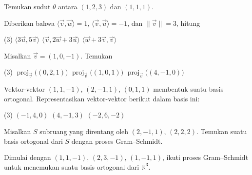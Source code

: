 \begin{exercise}
Temukan sudut $\theta$ antara
$(1,2,3)$ dan $(1,1,1)$.
\end{exercise}

\begin{exercise}
Diberikan bahwa $\langle \vec{v} , \vec{w} \rangle = 1$,
$\langle \vec{v} , \vec{u} \rangle = -1$, dan
$\lVert \vec{v} \rVert = 3$, hitung
\begin{tasks}(3)
\task $\langle 3 \vec{u} , 5 \vec{v} \rangle$
\task $\langle \vec{v} , 2 \vec{w} + 3 \vec{u} \rangle$
\task $\langle \vec{w} + 3 \vec{v}, \vec{v} \rangle$
\end{tasks}
\end{exercise}

\begin{exercise}
Misalkan $\vec{v} = (1,0,-1)$. Temukan
\begin{tasks}(3)
\task $\operatorname{proj}_{\vec{v}}\bigl( (0,2,1) \bigr)$
\task $\operatorname{proj}_{\vec{v}}\bigl( (1,0,1) \bigr)$
\task $\operatorname{proj}_{\vec{v}}\bigl( (4,-1,0) \bigr)$
\end{tasks}
\end{exercise}

\begin{exercise}
Vektor-vektor $(1,1,-1)$, $(2,-1,1)$, $(0,1,1)$ membentuk suatu basis ortogonal.
Representasikan vektor-vektor berikut dalam basis ini:
\begin{tasks}(3)
\task $(-1,4,0)$
\task $(4,-1,3)$
\task $(-2,6,-2)$
\end{tasks}
\end{exercise}

\begin{exercise}
Misalkan $S$ subruang yang direntang oleh
$(2,-1,1)$, $(2,2,2)$. Temukan suatu basis ortogonal dari $S$
dengan proses Gram--Schmidt.
\end{exercise}

\begin{exercise}
Dimulai dengan $(1,1,-1)$, $(2,3,-1)$, $(1,-1,1)$, ikuti proses Gram--Schmidt
untuk menemukan suatu basis ortogonal dari ${\mathbb{R}}^3$.
\end{exercise}

